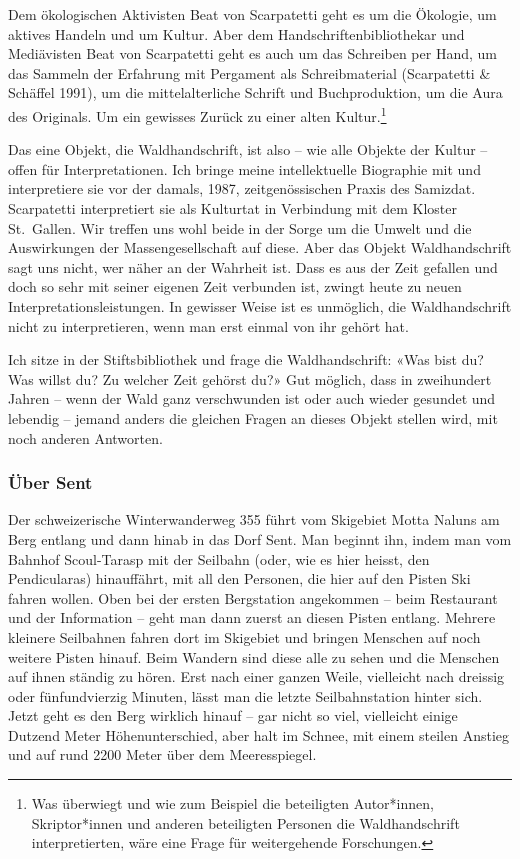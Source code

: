 \documentclass[a4paper,
fontsize=11pt,
oneside,
numbers=noperiodatend,
parskip=half-,
bibliography=totoc,
final
]{scrartcl}
\begin{document}
Dem ökologischen Aktivisten Beat von Scarpatetti geht es um die
Ökologie, um aktives Handeln und um Kultur. Aber dem
Handschriftenbibliothekar und Mediävisten Beat von Scarpatetti geht es
auch um das Schreiben per Hand, um das Sammeln der Erfahrung mit
Pergament als Schreibmaterial (Scarpatetti \& Schäffel 1991), um die
mittelalterliche Schrift und Buchproduktion, um die Aura des Originals.
Um ein gewisses Zurück zu einer alten Kultur.\footnote{Was überwiegt und
  wie zum Beispiel die beteiligten Autor*innen, Skriptor*innen und
  anderen beteiligten Personen die Waldhandschrift interpretierten, wäre
  eine Frage für weitergehende Forschungen.}

Das eine Objekt, die Waldhandschrift, ist also -- wie alle Objekte der
Kultur -- offen für Interpretationen. Ich bringe meine intellektuelle
Biographie mit und interpretiere sie vor der damals, 1987,
zeitgenössischen Praxis des Samizdat. Scarpatetti interpretiert sie als
Kulturtat in Verbindung mit dem Kloster St.~Gallen. Wir treffen uns wohl
beide in der Sorge um die Umwelt und die Auswirkungen der
Massengesellschaft auf diese. Aber das Objekt Waldhandschrift sagt uns
nicht, wer näher an der Wahrheit ist. Dass es aus der Zeit gefallen und
doch so sehr mit seiner eigenen Zeit verbunden ist, zwingt heute zu
neuen Interpretationsleistungen. In gewisser Weise ist es unmöglich, die
Waldhandschrift nicht zu interpretieren, wenn man erst einmal von ihr
gehört hat.

Ich sitze in der Stiftsbibliothek und frage die Waldhandschrift: «Was
bist du? Was willst du? Zu welcher Zeit gehörst du?» Gut möglich, dass
in zweihundert Jahren -- wenn der Wald ganz verschwunden ist oder auch
wieder gesundet und lebendig -- jemand anders die gleichen Fragen an
dieses Objekt stellen wird, mit noch anderen Antworten.

\subsubsection{Über Sent}\label{uxfcber-sent}

Der schweizerische Winterwanderweg 355 führt vom Skigebiet Motta Naluns
am Berg entlang und dann hinab in das Dorf Sent. Man beginnt ihn, indem
man vom Bahnhof Scoul-Tarasp mit der Seilbahn (oder, wie es hier heisst,
den Pendicularas) hinauffährt, mit all den Personen, die hier auf den
Pisten Ski fahren wollen. Oben bei der ersten Bergstation angekommen --
beim Restaurant und der Information -- geht man dann zuerst an diesen
Pisten entlang. Mehrere kleinere Seilbahnen fahren dort im Skigebiet und
bringen Menschen auf noch weitere Pisten hinauf. Beim Wandern sind diese
alle zu sehen und die Menschen auf ihnen ständig zu hören. Erst nach
einer ganzen Weile, vielleicht nach dreissig oder fünfundvierzig
Minuten, lässt man die letzte Seilbahnstation hinter sich. Jetzt geht es
den Berg wirklich hinauf -- gar nicht so viel, vielleicht einige Dutzend
Meter Höhenunterschied, aber halt im Schnee, mit einem steilen Anstieg
und auf rund 2200 Meter über dem Meeresspiegel.
\end{document}
